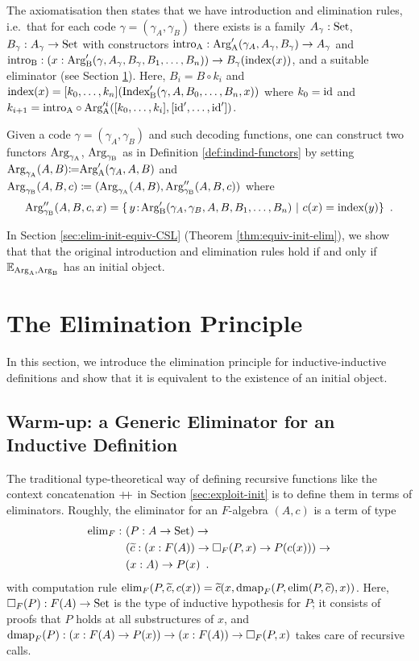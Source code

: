 \documentclass[orivec,envcountsame, ,envcountsect]{llncs}
\begin{document}
 The axiomatisation
then states that we have introduction and elimination rules, i.e.\ that
for each code $\gamma = (\gamma_A, \gamma_B)$ there exists is a family
$A_\gamma : \text{Set}$, $B_\gamma : A_\gamma \to \text{Set}$ with constructors
$\text{intro}_{\text{A}} : \text{Arg}_{\text{A}}'(\gamma_A, A_\gamma, B_\gamma) \to
A_\gamma$ and $\text{intro}_{\text{B}} : (x : \text{Arg}_{\text{B}}'(\gamma,
A_\gamma, B_\gamma, B_1, \ldots, B_n)) \to B_\gamma(\text{index}(x))$,
and a suitable eliminator (see Section \ref{sec:eliminator}). Here,
$B_i = B \circ k_i$ and $\text{index}(x) = [k_0,
  \ldots, k_n](\text{Index}'_{\text{B}}(\gamma, A, B_0, \ldots, B_n, x))$ where $k_0 = \text{id}$ and $k_{i+1}
= \text{intro}_{\text{A}} \circ \text{Arg}_{\text{A}}'^i([k_0,
  \ldots, k_{i}], [\text{id}', \ldots, \text{id}'])$.

Given a code $\gamma = (\gamma_A, \gamma_B)$ and such decoding functions, one
can construct two functors $\text{Arg}_{\gamma_\text{A}}$, $\text{Arg}_{\gamma_\text{B}}$ as in Definition \ref{def:indind-functors}
by setting $\text{Arg}_{\gamma_\text{A}}(A, B) {\coloneqq} \text{Arg}_{\text{A}}'(\gamma_A, A, B)$ and
$\text{Arg}_{\gamma_\text{B}}(A, B, c) \coloneqq (\text{Arg}_{\gamma_\text{A}}(A, B), \text{Arg}_{\gamma_\text{B}}''(A, B, c))$ where
\[
\text{Arg}_{\gamma_\text{B}}''(A, B, c, x) = \{\, y\!:\!\text{Arg}_{\text{B}}'(\gamma_A, \gamma_B, A, B, B_1, \ldots, B_n)
                                                \ |\  c(x) = \text{index}(y) \} \enspace .
\]


In Section \ref{sec:elim-init-equiv-CSL} (Theorem
\ref{thm:equiv-init-elim}), we show that that the original
introduction and elimination rules hold
if and only if $\mathbb{E}_{\text{Arg}_{\text{A}}, \text{Arg}_{\text{B}}}$ has an initial object.


\section{The Elimination Principle}
\label{sec:eliminator}

In this section, we introduce the elimination principle for
inductive-inductive definitions and show that it is equivalent to
the existence of an initial object.

\subsection{Warm-up: a Generic Eliminator for an Inductive Definition}
\label{sec:elim-ind-intro}

The traditional type-theoretical way of defining recursive functions
like the context concatenation $\mathbin{+\mkern-6mu+}$ in Section
\ref{sec:exploit-init} is to define them in terms of eliminators.
Roughly, the eliminator for an $F$-algebra $(A, c)$ is a term of type
\begin{align*}
\text{elim}_F :\ & (P : A \to \text{Set}) \to \\
         & (\widetilde{c} : (x : F(A)) \to \Box_F(P, x) \to P(c(x))) \to \\
         & (x : A) \to P(x) \enspace .
\end{align*}
with computation rule $\text{elim}_F(P, \widetilde{c}, c(x)) = \widetilde{c}(x, \text{dmap}_F(P,
\text{elim}(P, \widetilde{c}), x))$. Here, $\Box_F(P) : F(A) \to \text{Set}$ is the type of
inductive hypothesis for $P$; it consists of proofs that $P$ holds at
all substructures of $x$, and $\text{dmap}_F(P) : (x : F(A) \to P(x)) \to (x :
F(A)) \to \Box_F(P, x)$ takes care of recursive calls.
\end{document}
